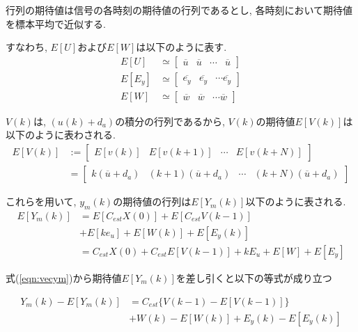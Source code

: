 \documentclass[a4paper,12pt]{jbook}
\begin{document}
行列の期待値は信号の各時刻の期待値の行列であるとし, 各時刻において期待値を標本平均で近似する.

すなわち, $E[U]$および$E[W]$は以下のように表す.\\
\begin{align}
E[U] &\simeq \begin{bmatrix} \overline{u} & \overline{u} & \cdots & \overline{u} \end{bmatrix}  \label{eqn:vecuave} \\
E[E_y] &\simeq \begin{bmatrix} \overline{e_y} & \overline{e_y} & \cdots \overline{e_y} \end{bmatrix}\label{eqn:veceyave} \\
E[W] &\simeq \begin{bmatrix} \overline{w} & \overline{w} & \cdots \overline{w} \end{bmatrix} \label{eqn:vecwave} 
\end{align}

$V(k)$は, $(u(k)+d_a)$の積分の行列であるから, $V(k)$の期待値$E[V(k)]$は以下のように表わされる.\\
\begin{align}
E[V(k)]&:= \begin{bmatrix} E[v(k)] & E[v(k+1)] & \cdots & E[v(k+N)] \end{bmatrix}\\
&= \begin{bmatrix} k(\overline{u} + d_a) & (k+1)(\overline{u}+ d_a) & \cdots & (k+N)(\overline{u}+ d_a) \end{bmatrix}  \label{eqn:vecvave}
\end{align}

これらを用いて, $y_m(k)$の期待値の行列は$E[Y_m(k)]$以下のように表される.\\
\begin{align}
E[Y_m(k)] &= E[C_{est} X(0)] + E[C_{est} V(k-1)] \\ &+ E[ke_u] + E[W(k)]+ E[E_y(k)] \\
 &= C_{est} X(0) + C_{est}E[V(k-1)] + kE_u + E[W] + E[E_y]   \label{eqn:vecymave} 
\end{align}

式(\ref{eqn:vecym})から期待値$E[Y_m(k)]$を差し引くと以下の等式が成り立つ

\begin{align}
Y_m(k) - E[Y_m(k)] &= C_{est} \{V(k-1) -E[V(k-1)]\}\\ 
&+ W(k) - E[W(k)] + E_y(k) - E[E_y(k)]\label{eqn:y=cv0}
\end{align}
\end{document}
